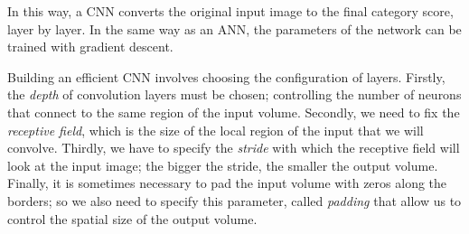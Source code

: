 In this way, a CNN converts the original input image to the final category score, layer by layer. In the same way as an ANN, the parameters of the network can be trained with gradient descent.

Building an efficient CNN involves choosing the configuration of layers. Firstly, the \textit{depth} of convolution layers must be chosen; controlling the number of neurons that connect to the same region of the input volume. 
Secondly, we need to fix the \textit{receptive field}, which is the size of the local region of the input that we will convolve. Thirdly, we have to specify the \textit{stride} with which the receptive field will look at the input image; the bigger the stride, the smaller the output volume. Finally,  it is sometimes necessary to pad the input volume with zeros along the borders; so we also need to specify this parameter, called \textit{padding} that allow us to control the spatial size of the output volume. 

